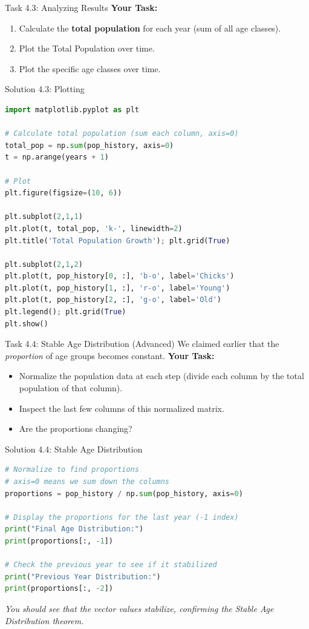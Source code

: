 \begin{frame}{Task 4.3: Analyzing Results}
\textbf{Your Task:}
\begin{enumerate}
    \item Calculate the \textbf{total population} for each year (sum of all age classes).
    \item Plot the Total Population over time.
    \item Plot the specific age classes over time.
\end{enumerate}
\end{frame}

\begin{frame}[fragile]{Solution 4.3: Plotting}
\tiny
\begin{lstlisting}[language=Python]
import matplotlib.pyplot as plt

# Calculate total population (sum each column, axis=0)
total_pop = np.sum(pop_history, axis=0)
t = np.arange(years + 1)

# Plot
plt.figure(figsize=(10, 6))

plt.subplot(2,1,1)
plt.plot(t, total_pop, 'k-', linewidth=2)
plt.title('Total Population Growth'); plt.grid(True)

plt.subplot(2,1,2)
plt.plot(t, pop_history[0, :], 'b-o', label='Chicks')
plt.plot(t, pop_history[1, :], 'r-o', label='Young')
plt.plot(t, pop_history[2, :], 'g-o', label='Old')
plt.legend(); plt.grid(True)
plt.show()
\end{lstlisting}
\end{frame}

\begin{frame}{Task 4.4: Stable Age Distribution (Advanced)}
We claimed earlier that the \textit{proportion} of age groups becomes constant.
\vspace{1em}
\textbf{Your Task:}
\begin{itemize}
    \item Normalize the population data at each step (divide each column by the total population of that column).
    \item Inspect the last few columns of this normalized matrix.
    \item Are the proportions changing?
\end{itemize}
\end{frame}

\begin{frame}[fragile]{Solution 4.4: Stable Age Distribution}
\small
\begin{lstlisting}[language=Python]
# Normalize to find proportions
# axis=0 means we sum down the columns
proportions = pop_history / np.sum(pop_history, axis=0)

# Display the proportions for the last year (-1 index)
print("Final Age Distribution:")
print(proportions[:, -1])

# Check the previous year to see if it stabilized
print("Previous Year Distribution:")
print(proportions[:, -2])
\end{lstlisting}

\vfill
\textit{You should see that the vector values stabilize, confirming the Stable Age Distribution theorem.}
\end{frame}

